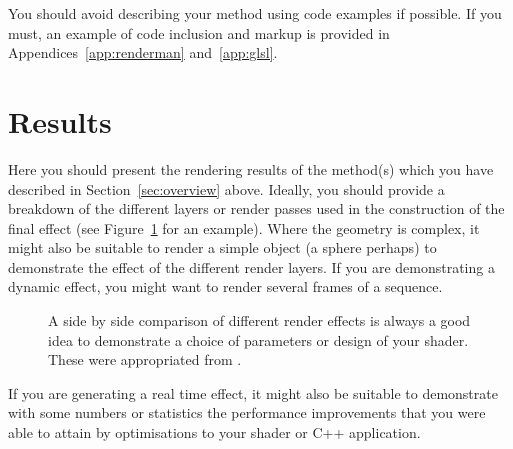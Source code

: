 \documentclass[]{acmsiggraph}
\begin{document}
You should avoid describing your method using code examples if possible. If you must, an example of code inclusion and markup is provided in Appendices~\ref{app:renderman} and~\ref{app:glsl}.

\section{Results} \label{sec:results}
Here you should present the rendering results of the method(s) which you have described in Section~\ref{sec:overview} above. Ideally, you should provide a breakdown of the different layers or render passes used in the construction of the final effect (see Figure~\ref{fig:comparison} for an example). Where the geometry is complex, it might also be suitable to render a simple object (a sphere perhaps) to demonstrate the effect of the different render layers. If you are demonstrating a dynamic effect, you might want to render several frames of a sequence.

\begin{figure}[htbp]
  \centering
 \hfill
 \caption{\label{fig:comparison}A side by side comparison of different render effects is always a good idea to demonstrate a choice of parameters or design of your shader. These were appropriated from \protect\cite{renderman16}.}
\end{figure}

If you are generating a real time effect, it might also be suitable to demonstrate with some numbers or statistics the performance improvements that you were able to attain by optimisations to your shader or C++ application. 
\end{document}
